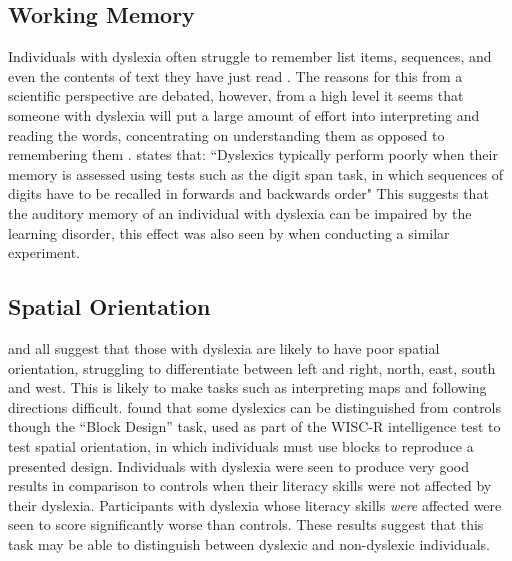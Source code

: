 \documentclass[journal]{IEEEtran}
\begin{document}
\subsection{Working Memory}
\label{sec:memory}
Individuals with dyslexia often struggle to remember list items, sequences, and even the contents of text they have just read \cite{snowling}. The reasons for this from a scientific perspective are debated, however, from a high level it seems that someone with dyslexia will put a large amount of effort into interpreting and reading the words, concentrating on understanding them as opposed to remembering them \cite{neurobiological}.
\cite{snowling} states that: ``Dyslexics typically perform poorly when their memory is assessed using tests such as the digit span task, in which sequences of digits have to be recalled in forwards and backwards order"
This suggests that the auditory memory of an individual with dyslexia can be impaired by the learning disorder, this effect was also seen by \cite{memory1980} when conducting a similar experiment. 

\subsection{Spatial Orientation}
\label{sec:spatial}
\cite{bartlett, tosee} and \cite{DetectAndManage}  all suggest that those with dyslexia are likely to have poor spatial orientation, struggling to differentiate between left and right, north, east, south and west. This is likely to make tasks such as interpreting maps and following directions difficult. 
\cite{sequential} found that some dyslexics can be distinguished from controls though the ``Block Design'' task, used as part of the WISC-R intelligence test to test spatial orientation\cite{wisc}, in which individuals must use blocks to reproduce a presented design. Individuals with dyslexia were seen to produce very good results in comparison to controls when their literacy skills were not affected by their dyslexia. Participants with dyslexia whose literacy skills \emph{were} affected were seen to score significantly worse than controls. These results suggest that this task may be able to distinguish between dyslexic and non-dyslexic individuals.
\end{document}
